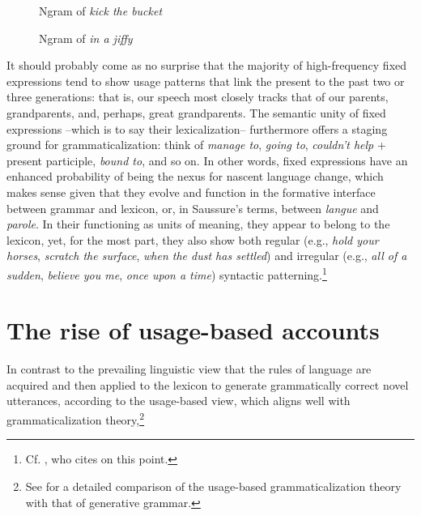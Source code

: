 \documentclass[output=paper]{langsci/langscibook}
\begin{document}
\begin{figure}
\caption{Ngram of \textit{kick the bucket}} %
\label{fig:6:2}
\end{figure}

\begin{figure}
\caption{Ngram of \textit{in a jiffy}} %
\label{fig:6:3}
\end{figure}

It should probably come as no surprise that the majority of high-frequency fixed expressions tend to show usage patterns that link the present to the past two or three generations: that is, our speech most closely tracks that of our parents, grandparents, and, perhaps, great grandparents. The semantic unity of fixed expressions –which is to say their lexicalization– furthermore offers a staging ground for grammaticalization: think of \textit{manage to}, \textit{going to}, \textit{couldn’t help} + present participle, \textit{bound to}, and so on. In other words, fixed expressions have an enhanced probability of being the nexus for nascent language change, which makes sense given that they evolve and function in the formative interface between grammar and lexicon, or, in Saussure’s terms, between \textit{langue} and \textit{parole}. In their functioning as units of meaning, they appear to belong to the lexicon, yet, for the most part, they also show both regular (e.g., \textit{hold your horses}, \textit{scratch the surface}, \textit{when the dust has settled}) and irregular (e.g., \textit{all of a sudden}, \textit{believe you me}, \textit{once upon a time}) syntactic patterning.\footnote{Cf. \citet[2--3]{wood_formulaic_2002}, who cites \citet[36]{richards_two_1983} on this point.}

\section{The rise of usage-based accounts}

In contrast to the prevailing linguistic view that the rules of language are acquired and then applied to the lexicon to generate grammatically correct novel utterances, according to the usage-based view, which aligns well with grammaticalization theory,\footnote{See \citet{kibbee_evolution_2010} for a detailed comparison of the usage-based grammaticalization theory with that of generative grammar.}
\end{document}
